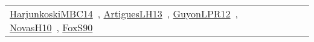 {\begin{longtable}{lp{3cm}>{\raggedright\arraybackslash}p{6cm}>{\raggedright\arraybackslash}p{6cm}>{\raggedright\arraybackslash}p{8cm}}
\href{../works/HarjunkoskiMBC14.pdf}{HarjunkoskiMBC14}~\cite{HarjunkoskiMBC14}, \href{../works/ArtiguesLH13.pdf}{ArtiguesLH13}~\cite{ArtiguesLH13}, \href{../works/GuyonLPR12.pdf}{GuyonLPR12}~\cite{GuyonLPR12}, \href{../works/NovasH10.pdf}{NovasH10}~\cite{NovasH10}, \href{../works/FoxS90.pdf}{FoxS90}~\cite{FoxS90}\\
\end{longtable}
}

